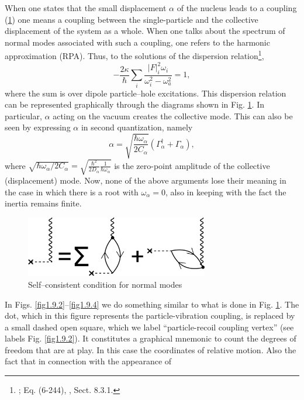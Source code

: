 \begin{subappendices}
When one states that the small displacement 
$\alpha$ of the nucleus leads to a coupling (\ref{fig1.D.1}) one means a coupling between the
single-particle and the collective displacement of the system as a whole. When one talks about the spectrum of normal modes 
associated  with such a coupling, one refers to the harmonic approximation (RPA). Thus, to the solutions of the dispersion relation\footnote{\cite{Bohr:75}; Eq. (6-244), \cite{Brink:05}, Sect. 8.3.1.},
\begin{equation}\label{eq1.D.5x}
- \frac{2 \kappa}{\hbar} \sum_i \frac{|F|_i^2 \omega_i}{\omega_i^2 - \omega_a^2} = 1,
\end{equation}
where the sum is over  dipole particle--hole excitations. This dispersion relation can be represented graphically 
through the diagrams shown in Fig. \ref{fig1.D.1}. In particular, 
$\alpha$ acting on the vacuum creates the collective mode. This can also be seen by expressing $\alpha$ in second quantization, namely
\begin{equation}
\alpha = \sqrt { \frac{\hbar \omega_{\alpha}}{2C_{\alpha}} }
 (\Gamma_{\alpha}^{\dagger} + \Gamma_{\alpha}),
  \end{equation}
  where $\sqrt{ \hbar \omega_{\alpha}/2 C_{\alpha}} = \sqrt{\frac{\hbar^2}{2D_{\alpha} }\frac{1}{\hbar \omega_{\alpha}}}$ is the zero-point amplitude
of the collective (displacement) mode. 
Now, none of the above arguments lose their meaning  in the case in which there is a root with $\omega_{\alpha}= 0$, 
also in keeping  with the fact the  inertia remains finite. 
               \begin{figure}
               \centerline {
               \includegraphics*[width=8cm]{introduccion/figs/fig1D1}
               }
               \caption{Self--consistent condition for normal modes}
               \label{fig1.D.1}
               \end{figure}
In Figs. \ref{fig1.9.2}--\ref{fig1.9.4} we do something   similar to what is done in Fig. \ref{fig1.D.1}. The dot, which in this figure represents the particle-vibration coupling, is 
replaced by a small dashed open square, which we  label ``particle-recoil coupling vertex'' (see labels Fig. \ref{fig1.9.2}). It constitutes a graphical mnemonic 
to count  the degrees of freedom that are at play. In this case the coordinates of relative motion. Also the fact that in connection with the appearance of 

\end{subappendices}
